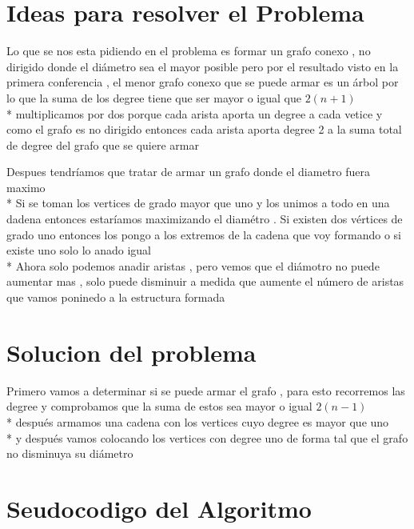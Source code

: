 \documentclass[10pt]{article}
\begin{document}
    \section{Ideas para resolver el Problema } 

    \noindent Lo que se nos esta pidiendo en el problema es formar un grafo conexo , no dirigido donde el di\'ametro sea el mayor posible 
    pero por el resultado visto en la primera conferencia , el menor grafo conexo que se puede armar es un \'arbol por lo que la suma de los degree tiene que ser mayor o igual  que $2\left(n+1\right)$  
    \\*
    multiplicamos por dos porque cada arista aporta un degree a cada vetice y como el grafo es no dirigido entonces cada arista aporta degree 2 a la suma total de degree del grafo que se quiere armar  

    \vspace*{0.5cm}
    \noindent Despues tendr\'iamos que tratar de armar un grafo donde  el diametro fuera maximo 
    \\*
    Si se toman los vertices de grado mayor que uno y los unimos a todo en una dadena entonces estar\'iamos maximizando el diam\'etro . Si existen dos v\'ertices de grado uno entonces los pongo a los extremos de la cadena que voy formando  o si existe uno solo lo anado igual 
    \\*
    Ahora solo podemos anadir aristas , pero vemos que el di\'amotro no puede aumentar mas , solo puede disminuir a medida que aumente el n\'umero de aristas que vamos poninedo a la estructura formada  
    \noindent 

    \section{Solucion del problema } 

    \noindent Primero vamos a determinar si se puede armar el grafo , para esto recorremos las degree y comprobamos que la suma de estos sea mayor o igual $2\left(n-1\right)$
    \\*
    despu\'es armamos una cadena con los vertices cuyo degree es mayor que uno 
    \\*
    y despu\'es vamos colocando los vertices con degree uno de forma tal que el grafo no disminuya su di\'ametro 

    \section{Seudocodigo del Algoritmo } 
    
\end{document}
